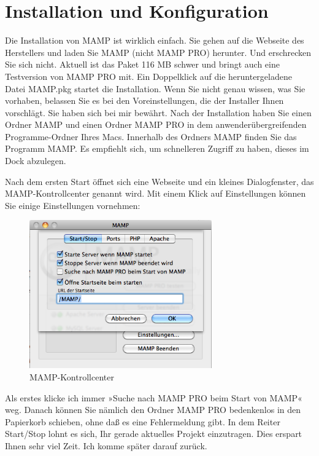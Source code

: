 \documentclass[11pt]{report}
\begin{document}
\section{Installation und Konfiguration}
\label{sec-2-2-2}


Die Installation von MAMP ist wirklich einfach. Sie gehen auf die
Webseite des Herstellers und laden Sie MAMP (nicht MAMP PRO)
herunter. Und erschrecken Sie sich nicht. Aktuell ist das Paket 116 MB
schwer und bringt auch eine Testversion von MAMP PRO mit. Ein
Doppelklick auf die heruntergeladene Datei MAMP.pkg startet die
Installation. Wenn Sie nicht genau wissen, was Sie vorhaben, belassen
Sie es bei den Voreinstellungen, die der Installer Ihnen
vorschlägt. Sie haben sich bei mir bewährt. Nach der Installation
haben Sie einen Ordner MAMP und einen Ordner MAMP PRO in dem
anwenderübergreifenden Programme-Ordner Ihres Macs. Innerhalb des
Ordners MAMP finden Sie das Programm MAMP. Es empfiehlt sich, um
schnelleren Zugriff zu haben, dieses im Dock abzulegen.


Nach dem ersten Start öffnet sich eine Webseite und ein kleines
Dialogfenster, das MAMP-Kontrollcenter genannt wird. Mit einem Klick
auf Einstellungen können Sie einige Einstellungen vornehmen:

\begin{figure}[h!]
\centering
\includegraphics[width=0.7\textwidth]{./images/mamp02.png}
\caption{\label{mamp02}MAMP-Kontrollcenter}
\end{figure}


Als erstes klicke ich immer »Suche nach MAMP PRO beim Start von MAMP«
weg. Danach können Sie nämlich den Ordner MAMP PRO bedenkenlos in den
Papierkorb schieben, ohne daß es eine Fehlermeldung gibt. In dem
Reiter Start/Stop lohnt es sich, Ihr gerade aktuelles Projekt
einzutragen. Dies erspart Ihnen sehr viel Zeit. Ich komme später
darauf zurück.
\end{document}
